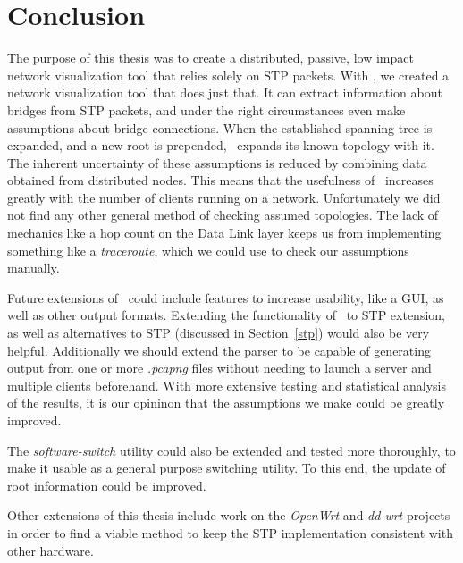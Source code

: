 \chapter{Conclusion}
\label{conclusion}
The purpose of this thesis was to create a distributed, passive, low impact network visualization tool that relies solely on STP packets.
With \tool, we created a network visualization tool that does just that.
It can extract information about bridges from STP packets, and under the right circumstances even make assumptions about bridge connections.
When the established spanning tree is expanded, and a new root is prepended, \tool\ expands its known topology with it.
The inherent uncertainty of these assumptions is reduced by combining data obtained from distributed nodes.
This means that the usefulness of \tool\ increases greatly with the number of clients running on a network.
Unfortunately we did not find any other general method of checking assumed topologies.
The lack of mechanics like a hop count on the Data Link layer keeps us from implementing something like a \textit{traceroute}, which we could use to check our assumptions manually.

Future extensions of \tool\ could include features to increase usability, like a GUI, as well as other output formats.
Extending the functionality of \tool\ to STP extension, as well as alternatives to STP (discussed in Section~\ref{stp}) would also be very helpful.
Additionally we should extend the parser to be capable of generating output from one or more \textit{.pcapng} files without needing to launch a server and multiple clients beforehand.
With more extensive testing and statistical analysis of the results, it is our opininon that the assumptions we make could be greatly improved.

The \textit{software-switch} utility could also be extended and tested more thoroughly, to make it usable as a general purpose switching utility.
To this end, the update of root information could be improved.

Other extensions of this thesis include work on the \textit{OpenWrt} and \textit{dd-wrt} projects in order to find a viable method to keep the STP implementation consistent with other hardware.
